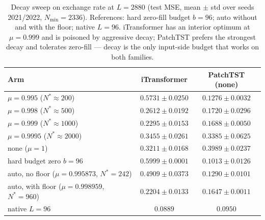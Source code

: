\begin{table}[t]
\caption{Decay sweep on exchange rate at $L{=}2880$ (test MSE, mean $\pm$ std over seeds 2021/2022, $N_{\min}{=}2336$). References: hard zero-fill budget $b{=}96$; auto without and with the floor; native $L{=}96$. iTransformer has an interior optimum at $\mu{=}0.999$ and is poisoned by aggressive decay; PatchTST prefers the strongest decay and tolerates zero-fill --- decay is the only input-side budget that works on both families.}
\label{tab:decay_exchange}
\centering\small
\begin{tabular}{lcc}
\toprule
Arm & iTransformer & PatchTST (none) \\
\midrule
$\mu = 0.995$ ($N^*{\approx}200$) & $0.5731 \pm 0.0250$ & $\mathbf{0.1276 \pm 0.0032}$ \\
$\mu = 0.998$ ($N^*{\approx}500$) & $0.2612 \pm 0.0192$ & $0.1720 \pm 0.0296$ \\
$\mu = 0.999$ ($N^*{\approx}1000$) & $\mathbf{0.2295 \pm 0.0153}$ & $0.1688 \pm 0.0050$ \\
$\mu = 0.9995$ ($N^*{\approx}2000$) & $0.3455 \pm 0.0261$ & $0.3385 \pm 0.0625$ \\
none ($\mu = 1$) & $0.3211 \pm 0.0168$ & $0.3989 \pm 0.0237$ \\
hard budget zero $b{=}96$ & $0.5999 \pm 0.0001$ & $0.1013 \pm 0.0126$ \\
auto, no floor ($\mu{=}0.995873$, $N^*{=}242$) & $0.4909 \pm 0.0373$ & $0.1290 \pm 0.0101$ \\
auto, with floor ($\mu{=}0.998959$, $N^*{=}960$) & $\mathbf{0.2204 \pm 0.0133}$ & $0.1647 \pm 0.0011$ \\
native $L{=}96$ & $0.0889$ & $0.0950$ \\
\bottomrule
\end{tabular}
\end{table}

